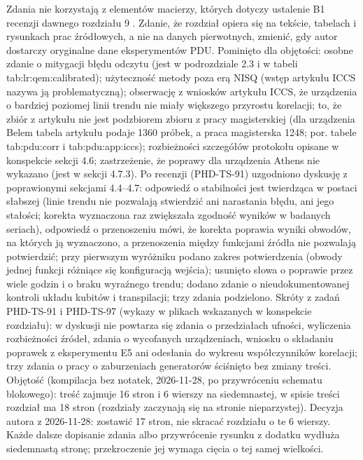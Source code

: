 {Zdania nie korzystają z elementów macierzy, których dotyczy ustalenie B1 recenzji dawnego rozdziału 9 .
Zdanie, że rozdział opiera się na tekście, tabelach i rysunkach prac źródłowych, a nie na danych pierwotnych, zmienić, gdy autor dostarczy oryginalne dane eksperymentów PDU.
Pominięto dla objętości: osobne zdanie o mitygacji błędu odczytu (jest w podrozdziale 2.3 i w tabeli tab:lr:qem:calibrated); użyteczność metody poza erą NISQ (wstęp artykułu ICCS nazywa ją problematyczną); obserwację z wniosków artykułu ICCS, że urządzenia o bardziej poziomej linii trendu nie miały większego przyrostu korelacji; to, że zbiór z artykułu nie jest podzbiorem zbioru z pracy magisterskiej (dla urządzenia Belem tabela artykułu podaje 1360 próbek, a praca magisterska 1248; por. tabele tab:pdu:corr i tab:pdu:app:iccs); rozbieżności szczegółów protokołu opisane w konspekcie sekcji 4.6; zastrzeżenie, że poprawy dla urządzenia Athens nie wykazano (jest w sekcji 4.7.3).
Po recenzji (PHD-TS-91) uzgodniono dyskusję z poprawionymi sekcjami 4.4--4.7: odpowiedź o stabilności jest twierdząca w postaci słabszej (linie trendu nie pozwalają stwierdzić ani narastania błędu, ani jego stałości; korekta wyznaczona raz zwiększała zgodność wyników w badanych seriach), odpowiedź o przenoszeniu mówi, że korekta poprawia wyniki obwodów, na których ją wyznaczono, a przenoszenia między funkcjami źródła nie pozwalają potwierdzić; przy pierwszym wyróżniku podano zakres potwierdzenia (obwody jednej funkcji różniące się konfiguracją wejścia); usunięto słowa o poprawie przez wiele godzin i o braku wyraźnego trendu; dodano zdanie o nieudokumentowanej kontroli układu kubitów i transpilacji; trzy zdania podzielono.
Skróty z zadań PHD-TS-91 i PHD-TS-97 (wykazy w plikach wskazanych w konspekcie rozdziału): w dyskusji nie powtarza się zdania o przedziałach ufności, wyliczenia rozbieżności źródeł, zdania o wycofanych urządzeniach, wniosku o składaniu poprawek z eksperymentu E5 ani odesłania do wykresu współczynników korelacji; trzy zdania o pracy o zaburzeniach generatorów ściśnięto bez zmiany treści.
Objętość (kompilacja bez notatek, 2026-11-28, po przywróceniu schematu blokowego): treść zajmuje 16 stron i 6 wierszy na siedemnastej, w spisie treści rozdział ma 18 stron (rozdziały zaczynają się na stronie nieparzystej).
Decyzja autora z 2026-11-28: zostawić 17 stron, nie skracać rozdziału o te 6 wierszy.
Każde dalsze dopisanie zdania albo przywrócenie rysunku z dodatku wydłuża siedemnastą stronę; przekroczenie jej wymaga cięcia o tej samej wielkości.
}


